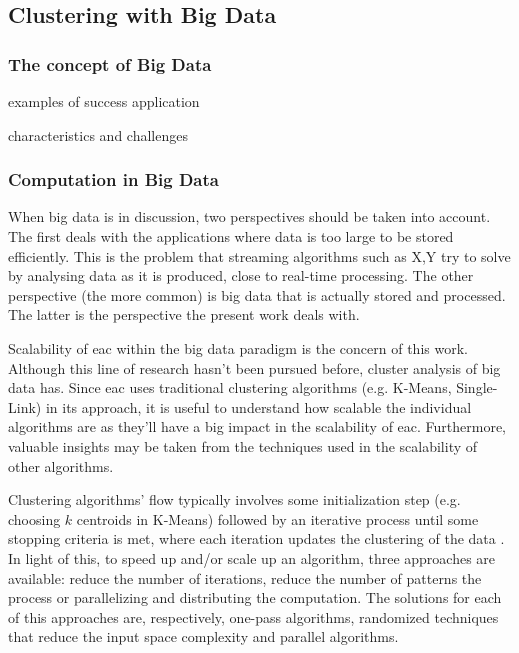 \subsection{Clustering with Big Data}

\subsubsection{The concept of Big Data}

examples of success application

characteristics and challenges


\subsubsection{Computation in Big Data}
When big data is in discussion, two perspectives should be taken into account. The first deals with the applications where data is too large to be stored efficiently. This is the problem that streaming algorithms such as X,Y try to solve by analysing data as it is produced, close to real-time processing. %
The other perspective (the more common) is big data that is actually stored and processed. The latter is the perspective the present work deals with.

Scalability of \gls{eac} within the big data paradigm is the concern of this work. Although this line of research hasn't been pursued before, cluster analysis of big data has. %
Since \gls{eac} uses traditional clustering algorithms (e.g. K-Means, Single-Link) in its approach, it is useful to understand how scalable the individual algorithms are as they'll have a big impact in the scalability of \gls{eac}. Furthermore, valuable insights may be taken from the techniques used in the scalability of other algorithms.


Clustering algorithms' flow typically involves some initialization step (e.g. choosing $k$ centroids in K-Means) followed by an iterative process until some stopping criteria is met, where each iteration updates the clustering of the data \cite{Aggarwal2014}. In light of this, to speed up and/or scale up an algorithm, three approaches are available: reduce the number of iterations, reduce the number of patterns the process or parallelizing and distributing the computation. The solutions for each of this approaches are, respectively, one-pass algorithms, randomized techniques that reduce the input space complexity and parallel algorithms.

